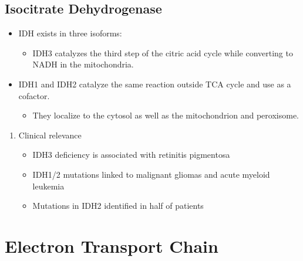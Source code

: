 \documentclass{scrartcl}
\begin{document}
\subsection{Isocitrate Dehydrogenase}
\label{sec:org74fc847}
\begin{itemize}
\item IDH exists in three isoforms:
\begin{itemize}
\item IDH3 catalyzes the third step of the citric acid cycle while converting  to NADH in the mitochondria.
\end{itemize}
\end{itemize}


\begin{itemize}
\item IDH1 and IDH2 catalyze the same reaction outside TCA cycle and use  as a cofactor.
\begin{itemize}
\item They localize to the cytosol as well as the mitochondrion and peroxisome.
\end{itemize}
\end{itemize}


\begin{enumerate}
\item Clinical relevance
\label{sec:orgbaf4692}
\begin{itemize}
\item IDH3 deficiency is associated with retinitis pigmentosa
\item IDH1/2 mutations linked to malignant gliomas and acute myeloid leukemia
\item Mutations in IDH2 identified in half of patients
\end{itemize}
\end{enumerate}
\section{Electron Transport Chain}
\label{sec:orge2990e6}
\end{document}
